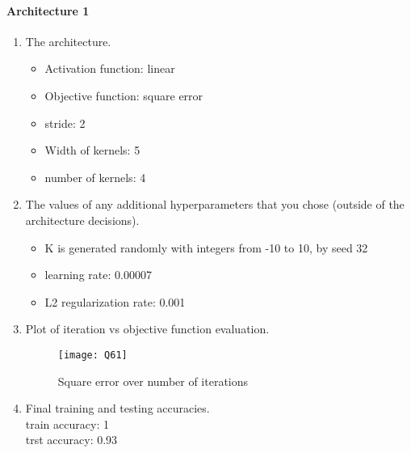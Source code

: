 \documentclass[12pt]{article}
\begin{document}
\paragraph{Architecture 1}
\begin{enumerate}
\item The architecture.
\begin{itemize}
\item[]Activation function: linear
\item[]Objective function: square error
\item[]stride: 2
\item[]Width of kernels: 5
\item[]number of kernels: 4
\end{itemize}

\item The values of any additional hyperparameters that you chose (outside of the architecture decisions).
\begin{itemize}
\item[]K is generated randomly with integers from -10 to 10, by seed 32
\item[]learning rate: 0.00007
\item[]L2 regularization rate: 0.001
\end{itemize}

\item Plot of iteration vs objective function evaluation.
\begin{figure}[H]
\centering
\texttt{[image: Q61]}
\caption{Square error over number of iterations}
\end{figure} 
\item Final training and testing accuracies.\\
train accuracy: 1\\
trst accuracy: 0.93

\end{enumerate}
\end{document}
